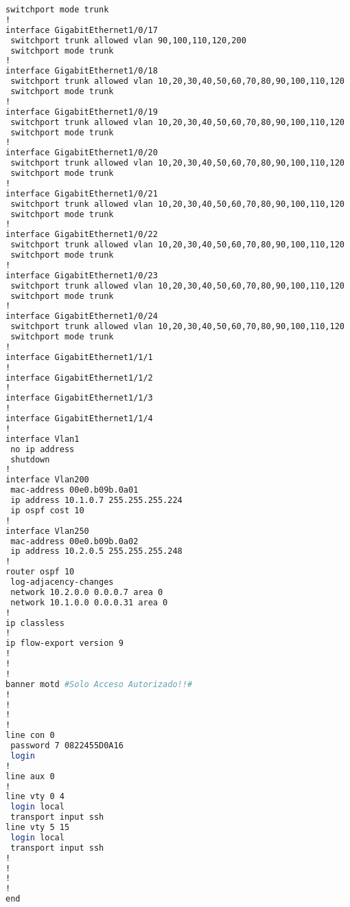 \begin{lstlisting}[language=Bash, caption={Configuración Completa Switch Core 1}]
 switchport mode trunk
!
interface GigabitEthernet1/0/17
 switchport trunk allowed vlan 90,100,110,120,200
 switchport mode trunk
!
interface GigabitEthernet1/0/18
 switchport trunk allowed vlan 10,20,30,40,50,60,70,80,90,100,110,120
 switchport mode trunk
!
interface GigabitEthernet1/0/19
 switchport trunk allowed vlan 10,20,30,40,50,60,70,80,90,100,110,120
 switchport mode trunk
!
interface GigabitEthernet1/0/20
 switchport trunk allowed vlan 10,20,30,40,50,60,70,80,90,100,110,120
 switchport mode trunk
!
interface GigabitEthernet1/0/21
 switchport trunk allowed vlan 10,20,30,40,50,60,70,80,90,100,110,120
 switchport mode trunk
!
interface GigabitEthernet1/0/22
 switchport trunk allowed vlan 10,20,30,40,50,60,70,80,90,100,110,120
 switchport mode trunk
!
interface GigabitEthernet1/0/23
 switchport trunk allowed vlan 10,20,30,40,50,60,70,80,90,100,110,120
 switchport mode trunk
!
interface GigabitEthernet1/0/24
 switchport trunk allowed vlan 10,20,30,40,50,60,70,80,90,100,110,120
 switchport mode trunk
!
interface GigabitEthernet1/1/1
!
interface GigabitEthernet1/1/2
!
interface GigabitEthernet1/1/3
!
interface GigabitEthernet1/1/4
!
interface Vlan1
 no ip address
 shutdown
!
interface Vlan200
 mac-address 00e0.b09b.0a01
 ip address 10.1.0.7 255.255.255.224
 ip ospf cost 10
!
interface Vlan250
 mac-address 00e0.b09b.0a02
 ip address 10.2.0.5 255.255.255.248
!
router ospf 10
 log-adjacency-changes
 network 10.2.0.0 0.0.0.7 area 0
 network 10.1.0.0 0.0.0.31 area 0
!
ip classless
!
ip flow-export version 9
!
!
!
banner motd #Solo Acceso Autorizado!!#
!
!
!
!
line con 0
 password 7 0822455D0A16
 login
!
line aux 0
!
line vty 0 4
 login local
 transport input ssh
line vty 5 15
 login local
 transport input ssh
!
!
!
!
end
\end{lstlisting}
